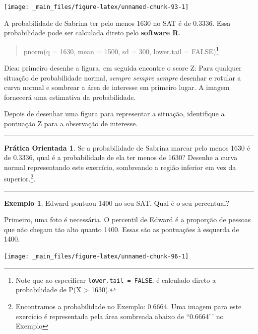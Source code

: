 \documentclass[
]{book}
\theoremstyle{definition}
\theoremstyle{definition}
\newtheorem{example}{Exemplo}[chapter]
\theoremstyle{definition}
\newtheorem{exercise}{Prática Orientada}[chapter]
\theoremstyle{definition}
\theoremstyle{remark}
\begin{document}
\texttt{[image: \_main\_files/figure-latex/unnamed-chunk-93-1]}

A probabilidade de Sabrina ter pelo menos 1630 no SAT é de 0.3336. Essa probabilidade pode ser calculada direto pelo \textbf{software R}.

\begin{quote}
pnorm(q = 1630, mean = 1500, sd = 300, lower.tail = FALSE)\footnote{Note que ao especificar \texttt{lower.tail\ =\ FALSE}, é calculado direto a probabilidade de P(X \textgreater{} 1630).}
\end{quote}

Dica: primeiro desenhe a figura, em seguida encontre o score Z: Para qualquer situação de probabilidade normal, \emph{sempre sempre sempre} desenhar e rotular a curva normal e sombrear a área de interesse em primeiro lugar. A imagem fornecerá uma estimativa da probabilidade.

Depois de desenhar uma figura para representar a situação, identifique a pontuação Z para a observação de interesse.

\begin{center}\rule{0.5\linewidth}{0.5pt}\end{center}

\begin{exercise}
\protect\hypertarget{exr:unnamed-chunk-95}{}{\label{exr:unnamed-chunk-95} }Se a probabilidade de Sabrina marcar pelo menos 1630 é de 0.3336, qual é a probabilidade de ela ter menos de 1630? Desenhe a curva normal representando este exercício, sombreando a região inferior em vez da superior.\footnote{Encontramos a probabilidade no Exemplo: 0.6664. Uma imagem para este exercício é representada pela área sombreada abaixo de ``0.6664'\,' no Exemplo}.
\end{exercise}

\begin{center}\rule{0.5\linewidth}{0.5pt}\end{center}

\begin{example}
\protect\hypertarget{exm:ex4}{}{\label{exm:ex4} }Edward pontuou 1400 no seu SAT. Qual é o seu percentual?
\end{example}

Primeiro, uma foto é necessária. O percentil de Edward é a proporção de pessoas que não chegam tão alto quanto 1400. Essas são as pontuações à esquerda de 1400.

\texttt{[image: \_main\_files/figure-latex/unnamed-chunk-96-1]}
\end{document}
